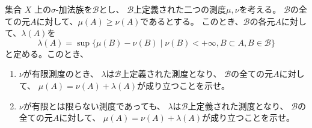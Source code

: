 \documentclass[report]{jlreq}
\begin{document}
\begin{problem}[第10問]
    集合 $X$ 上の$\sigma$-加法族を$\mathcal{B}$とし、
    $\mathcal{B}$上定義された二つの測度$\mu, \nu$を考える。
    $\mathcal{B}$の全ての元$A$に対して、$\mu(A) \ge \nu(A)$であるとする。
    このとき、$\mathcal{B}$の各元$A$に対して、$\lambda(A)$を
    \begin{equation}
        \lambda(A) =
            \sup\{\mu(B) - \nu(B) \mid \nu(B) < +\infty, B \subset A, B \in \mathcal{B}\}
    \end{equation}
    と定める。このとき、
    \begin{enumerate}
        \item $\nu$が有限測度のとき、
            $\lambda$は$\mathcal{B}$上定義された測度となり、
            $\mathcal{B}$の全ての元$A$に対して、
            $\mu(A) = \nu(A) + \lambda(A)$が成り立つことを示せ。
        \item $\nu$が有限とは限らない測度であっても、
            $\lambda$は$\mathcal{B}$上定義された測度となり、
            $\mathcal{B}$の全ての元$A$に対して、
            $\mu(A) = \nu(A) + \lambda(A)$が成り立つことを示せ。
    \end{enumerate}
\end{problem}

\begin{answer}
    
\end{answer}
\end{document}
